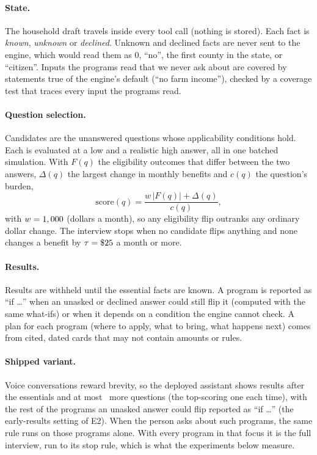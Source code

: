 \documentclass[11pt]{article}
\begin{document}
\paragraph{State.} The household draft travels inside every tool call (nothing is stored). Each fact is \emph{known}, \emph{unknown} or \emph{declined}. Unknown and declined facts are never sent to the engine, which would read them as 0, ``no'', the first county in the state, or ``citizen''. Inputs the programs read that we never ask about are covered by statements true of the engine's default (``no farm income''), checked by a coverage test that traces every input the programs read.

\paragraph{Question selection.} Candidates are the unanswered questions whose applicability conditions hold. Each is evaluated at a low and a realistic high answer, all in one batched simulation. With $F(q)$ the eligibility outcomes that differ between the two answers, $\Delta(q)$ the largest change in monthly benefits and $c(q)$ the question's burden,
\begin{equation}
  \mathrm{score}(q) = \frac{w\,|F(q)| + \Delta(q)}{c(q)},
\end{equation}
with $w=1,000$ (dollars a month), so any eligibility flip outranks any ordinary dollar change. The interview stops when no candidate flips anything and none changes a benefit by $\tau=\$25$ a month or more.

\paragraph{Results.} Results are withheld until the essential facts are known. A program is reported as ``if \ldots'' when an unasked or declined answer could still flip it (computed with the same what-ifs) or when it depends on a condition the engine cannot check. A plan for each program (where to apply, what to bring, what happens next) comes from cited, dated cards that may not contain amounts or rules.

\paragraph{Shipped variant.} Voice conversations reward brevity, so the deployed assistant shows results after the essentials and at most \quickquestions\ more questions (the top-scoring one each time), with the rest of the programs an unasked answer could flip reported as ``if \ldots'' (the early-results setting of E2). When the person asks about such programs, the same rule runs on those programs alone. With every program in that focus it is the full interview, run to its stop rule, which is what the experiments below measure.
\end{document}
